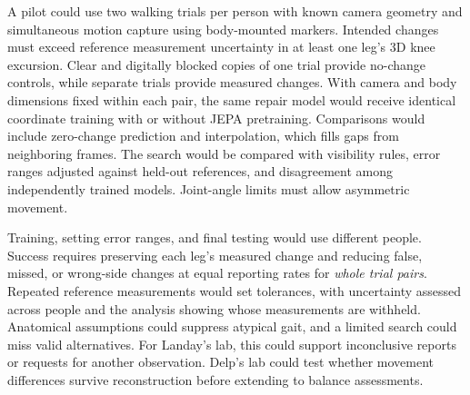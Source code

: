 \documentclass{article}
\begin{document}
A pilot could use two walking trials per person with known camera geometry and simultaneous motion capture using body-mounted markers. Intended changes must exceed reference measurement uncertainty in at least one leg's 3D knee excursion. Clear and digitally blocked copies of one trial provide no-change controls, while separate trials provide measured changes. With camera and body dimensions fixed within each pair, the same repair model would receive identical coordinate training with or without JEPA pretraining. Comparisons would include zero-change prediction and interpolation, which fills gaps from neighboring frames. The search would be compared with visibility rules, error ranges adjusted against held-out references, and disagreement among independently trained models. Joint-angle limits must allow asymmetric movement.

Training, setting error ranges, and final testing would use different people. Success requires preserving each leg's measured change and reducing false, missed, or wrong-side changes at equal reporting rates for \emph{whole trial pairs}. Repeated reference measurements would set tolerances, with uncertainty assessed across people and the analysis showing whose measurements are withheld. Anatomical assumptions could suppress atypical gait, and a limited search could miss valid alternatives. For Landay's lab, this could support inconclusive reports or requests for another observation. Delp's lab could test whether movement differences survive reconstruction before extending to balance assessments.

\clearpage


\end{document}
